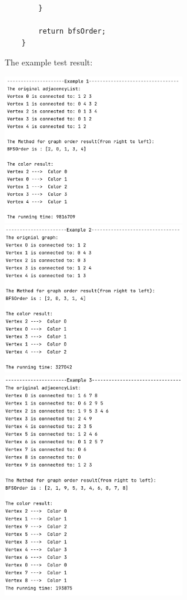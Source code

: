 \documentclass{article}
\begin{document}
\begin{enumerate}
\begin{verbatim}
        }
        
        return bfsOrder;
    }
    \end{verbatim}
        The example test result:
            \begin{center}
        \includegraphics[width=0.6\textwidth]{p12.png}
        \includegraphics[width=0.6\textwidth]{p13.png}
        \includegraphics[width=0.6\textwidth]{p14.png}
    \end{center}
    

\end{enumerate}
\end{document}

